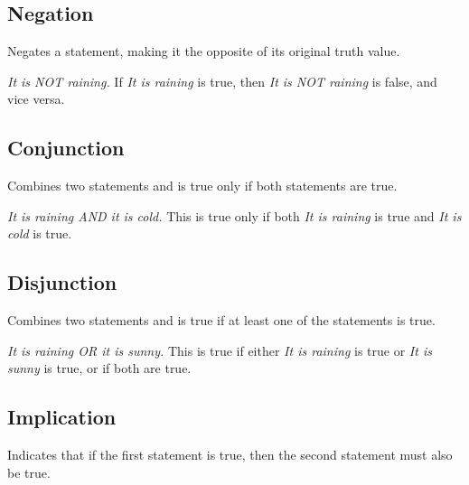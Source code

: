 \documentclass{article}
\theoremstyle{mytheoremstyle}
\theoremstyle{mytheoremstyle}
\theoremstyle{myexamplestyle}
\begin{document}
\subsection{Negation}

\begin{definition}
    Negates a statement, making it the opposite of its original truth value.
\end{definition}

\begin{example}
    \emph{It is NOT raining.} If \emph{It is raining} is true, then \emph{It is NOT raining} is false, and vice versa.
\end{example}

\subsection{Conjunction}
\begin{definition}
    Combines two statements and is true only if both statements are
    true.
\end{definition}

\begin{example}
    \emph{It is raining AND it is cold.} This is true only if both \emph{It is raining} is true and \emph{It is cold} is true.
\end{example}

\newpage

\subsection{Disjunction}

\begin{definition}
    Combines two statements and is true if at least one of the
    statements is true.
\end{definition}

\begin{example}
    \emph{It is raining OR it is sunny.} This is true if either
    \emph{It is raining} is true or \emph{It is sunny} is true, or
    if both are true.
\end{example}

\subsection{Implication}

\begin{definition}
    Indicates that if the first statement is true, then the second
    statement must also be true.
\end{definition}
\end{document}
